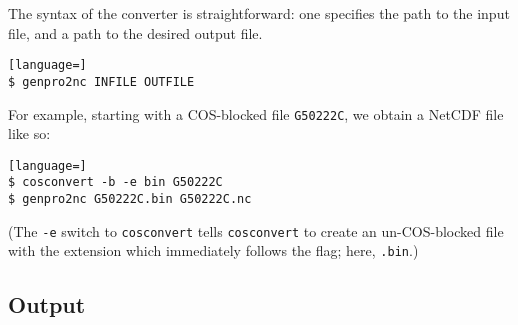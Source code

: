 \documentclass{report}
\begin{document}
The syntax of the converter is straightforward: one specifies the path to the input file, and a path to the desired output file.

\begin{lstlisting}[language=]
$ genpro2nc INFILE OUTFILE
\end{lstlisting}

\noindent For example, starting with a COS-blocked file \texttt{G50222C}, we obtain a NetCDF file like so:

\begin{lstlisting}[language=]
$ cosconvert -b -e bin G50222C
$ genpro2nc G50222C.bin G50222C.nc
\end{lstlisting}

\noindent (The \texttt{-e} switch to \texttt{cosconvert} tells \texttt{cosconvert} to create an un-COS-blocked file with the extension which immediately follows the flag; here, \texttt{.bin}.)

\subsection{Output}
\end{document}
